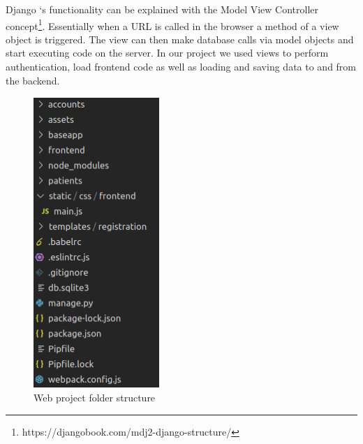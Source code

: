 Django ‘s functionality can be explained with the Model View Controller concept\footnote{https://djangobook.com/mdj2-django-structure/}. Essentially when a URL is called in the browser a method of a view object is triggered. The view can then make database calls via model objects and start executing code on the server. In our project we used views to perform authentication, load frontend code as well as loading and saving data to and from the backend.

\begin{figure}[h]
	\advance
	\leftskip 0.05in	
	\centering
	\includegraphics[width=1.87in,height=4.34in]{./media/image2.png} \caption{Web project folder structure}

\end{figure}

